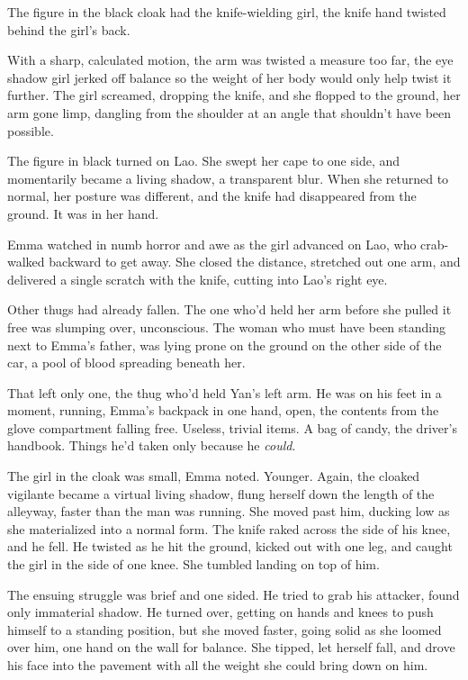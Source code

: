 The figure in the black cloak had the knife-wielding girl, the knife hand twisted behind the girl's back.



With a sharp, calculated motion, the arm was twisted a measure too far, the eye shadow girl jerked off balance so the weight of her body would only help twist it further.  The girl screamed, dropping the knife, and she flopped to the ground, her arm gone limp, dangling from the shoulder at an angle that shouldn't have been possible.



The figure in black turned on Lao.  She swept her cape to one side, and momentarily became a living shadow, a transparent blur.  When she returned to normal, her posture was different, and the knife had disappeared from the ground.  It was in her hand.



Emma watched in numb horror and awe as the girl advanced on Lao, who crab-walked backward to get away.  She closed the distance, stretched out one arm, and delivered a single scratch with the knife, cutting into Lao's right eye.



Other thugs had already fallen.  The one who'd held her arm before she pulled it free was slumping over, unconscious.  The woman who must have been standing next to Emma's father, was lying prone on the ground on the other side of the car, a pool of blood spreading beneath her.



That left only one, the thug who'd held Yan's left arm.  He was on his feet in a moment, running, Emma's backpack in one hand, open, the contents from the glove compartment falling free.  Useless, trivial items.  A bag of candy, the driver's handbook.  Things he'd taken only because he \emph{could}.



The girl in the cloak was small, Emma noted.  Younger.  Again, the cloaked vigilante became a virtual living shadow, flung herself down the length of the alleyway, faster than the man was running.  She moved past him, ducking low as she materialized into a normal form.  The knife raked across the side of his knee, and he fell.  He twisted as he hit the ground, kicked out with one leg, and caught the girl in the side of one knee.  She tumbled landing on top of him.



The ensuing struggle was brief and one sided.  He tried to grab his attacker, found only immaterial shadow.  He turned over, getting on hands and knees to push himself to a standing position, but she moved faster, going solid as she loomed over him, one hand on the wall for balance.  She tipped, let herself fall, and drove his face into the pavement with all the weight she could bring down on him.



